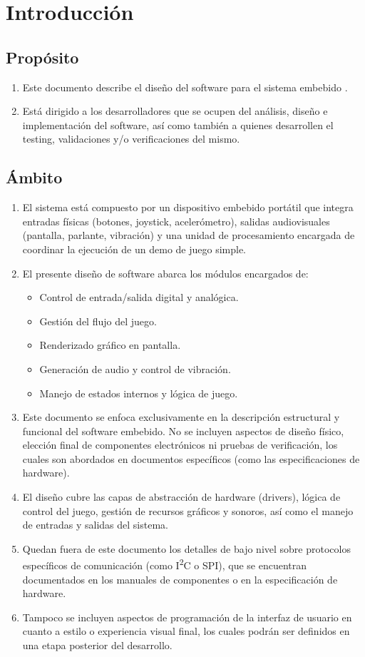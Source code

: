 \documentclass[11pt,a4paper]{article}
\begin{document}
\section{Introducción}
\subsection{Propósito}
\begin{enumerate}
  \item Este documento describe el diseño del software para el sistema embebido \textit{\ttitle}. 
  \item Está dirigido a los desarrolladores que se ocupen del análisis, diseño e implementación del software, así como también a quienes desarrollen el testing, validaciones y/o verificaciones del mismo.
\end{enumerate}

\subsection{Ámbito}
\begin{enumerate}
  \item El sistema está compuesto por un dispositivo embebido portátil que integra entradas físicas (botones, joystick, acelerómetro), salidas audiovisuales (pantalla, parlante, vibración) y una unidad de procesamiento encargada de coordinar la ejecución de un demo de juego simple.
  \item El presente diseño de software abarca los módulos encargados de:
  \begin{itemize}
    \item Control de entrada/salida digital y analógica.
    \item Gestión del flujo del juego.
    \item Renderizado gráfico en pantalla.
    \item Generación de audio y control de vibración.
    \item Manejo de estados internos y lógica de juego.
  \end{itemize}
  \item Este documento se enfoca exclusivamente en la descripción estructural y funcional del software embebido. No se incluyen aspectos de diseño físico, elección final de componentes electrónicos ni pruebas de verificación, los cuales son abordados en documentos específicos (como las especificaciones de hardware).
  \item El diseño cubre las capas de abstracción de hardware (drivers), lógica de control del juego, gestión de recursos gráficos y sonoros, así como el manejo de entradas y salidas del sistema. 
  \item Quedan fuera de este documento los detalles de bajo nivel sobre protocolos específicos de comunicación (como I\textsuperscript{2}C o SPI), que se encuentran documentados en los manuales de componentes o en la especificación de hardware.
  \item Tampoco se incluyen aspectos de programación de la interfaz de usuario en cuanto a estilo o experiencia visual final, los cuales podrán ser definidos en una etapa posterior del desarrollo.
\end{enumerate}
\end{document}
